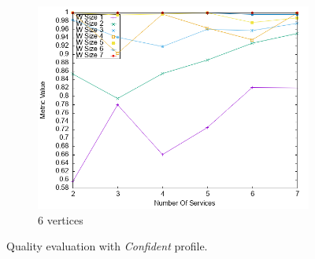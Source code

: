 \begin{figure}[ht]
\begin{subfigure}{0.33\textwidth}
    \includegraphics[width=\textwidth]{Images/graphs/newwindow_quality_performance_diff_perce_n7_s7_20_100_n7}
    \caption{6 vertices}
    \label{fig:quality_window_average_7n}
  \end{subfigure}
  \caption{ Quality evaluation with \textit{Confident} profile.}
  \label{fig:quality_window_average}
\end{figure}


